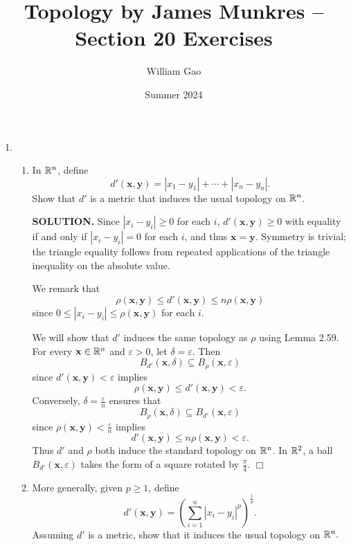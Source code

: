 \documentclass{article}
\title{Topology by James Munkres -- Section 20 Exercises}
\author{William Gao}
\date{Summer 2024}
\begin{document}
\maketitle

\begin{enumerate}
    \item \begin{enumerate}
        \item 
        In $\mathbb{R}^n$, define
        $$d'(\mathbf{x}, \mathbf{y}) = |x_1 - y_1| + \cdots + |x_n - y_n|.$$
        Show that $d'$ is a metric that induces the usual topology on $\mathbb{R}^n$.
    
        {\bf SOLUTION.} Since $|x_i - y_i| \geq 0$ for each $i$, $d'(\mathbf{x}, \mathbf{y}) \geq 0$ with equality if and only if $|x_i - y_i| = 0$ for each $i$, and thus $\mathbf{x} = \mathbf{y}$. Symmetry is trivial; the triangle equality follows from repeated applications of the triangle inequality on the absolute value.

        We remark that
        $$\rho(\mathbf{x}, \mathbf{y}) \leq d'(\mathbf{x}, \mathbf{y}) \leq n\rho(\mathbf{x}, \mathbf{y})$$
        since $0 \leq |x_i-y_i| \leq \rho(\mathbf{x}, \mathbf{y})$ for each $i.$

        We will show that $d'$ induces the same topology as $\rho$ using Lemma 2.59. For every $\mathbf{x} \in \mathbb{R}^n$ and $\varepsilon > 0$, let $\delta = \varepsilon$. Then
        $$B_{d'}(\mathbf{x}, \delta) \subseteq B_\rho(\mathbf{x}, \varepsilon)$$
        since $d'(\mathbf{x}, \mathbf{y}) < \varepsilon$ implies
        $$\rho(\mathbf{x}, \mathbf{y}) \leq d'(\mathbf{x}, \mathbf{y}) < \varepsilon.$$
        Conversely, $\delta = \frac{\varepsilon}{n}$ ensures that
        $$B_\rho(\mathbf{x}, \delta) \subseteq B_{d'}(\mathbf{x}, \varepsilon)$$
        since $\rho(\mathbf{x}, \mathbf{y}) < \frac{\varepsilon}{n}$ implies
        $$d'(\mathbf{x}, \mathbf{y}) \leq n \rho(\mathbf{x}, \mathbf{y}) < \varepsilon.$$
        Thus $d'$ and $\rho$ both induce the standard topology on $\mathbb{R}^n$. In $\mathbb{R}^2$, a ball $B_{d'}(\mathbf{x}, \varepsilon)$ takes the form of a square rotated by $\frac{\pi}{4}$. $\Box$

        \item More generally, given $p \geq 1$, define
        $$d'(\mathbf{x}, \mathbf{y}) = \left( \sum_{i=1}^n |x_i-y_i|^p \right)^\frac1p.$$
        Assuming $d'$ is a metric, show that it induces the usual topology on $\mathbb{R}^n.$


\end{enumerate}
\end{enumerate}
\end{document}
